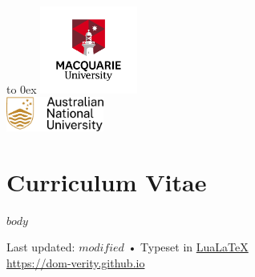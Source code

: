 \documentclass[10pt, a4paper]{article}
\begin{document}
\begin{flushright}%
  \vbox to 0ex{
    \includegraphics[width=0.24\textwidth]{images/newmulogo.png}\\%
    \includegraphics[width=0.24\textwidth]{images/2x_anu_logo_small.pdf}\vss}%
\end{flushright}%

\section{Curriculum Vitae}

$body$

\begin{center}
  {\scriptsize Last updated: $modified$ •
  Typeset in \href{http://nitens.org/taraborelli/cvtex}{
  Lua\LaTeX}\\
  \url{https://dom-verity.github.io}
  }
\end{center}
\end{document}
